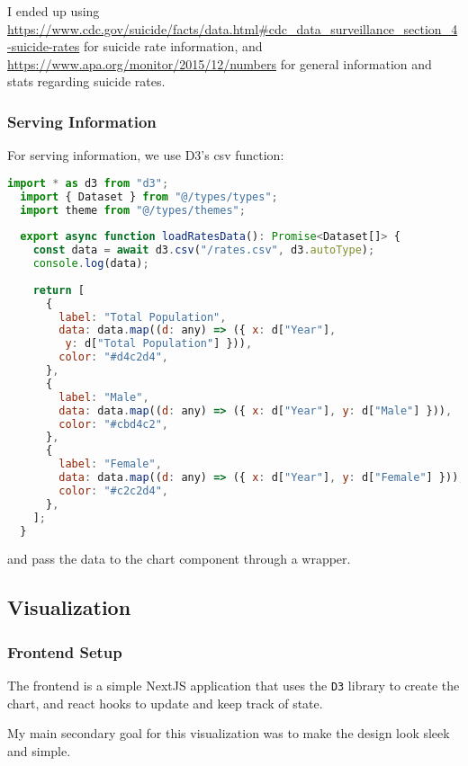 \documentclass{article}
\begin{document}
I ended up using \url{https://www.cdc.gov/suicide/facts/data.html#cdc_data_surveillance_section_4-suicide-rates}
for suicide rate information, and \url{https://www.apa.org/monitor/2015/12/numbers}
for general information and stats regarding suicide rates.

\subsubsection{Serving Information} 
\label{subsubsec:Serving Backend Server}

For serving information, we use D3's csv function:

\begin{lstlisting}[language=JavaScript]
  import * as d3 from "d3";
  import { Dataset } from "@/types/types";
  import theme from "@/types/themes";
  
  export async function loadRatesData(): Promise<Dataset[]> {
    const data = await d3.csv("/rates.csv", d3.autoType); 
    console.log(data); 
  
    return [
      {
        label: "Total Population",
        data: data.map((d: any) => ({ x: d["Year"],
         y: d["Total Population"] })), 
        color: "#d4c2d4", 
      },
      {
        label: "Male",
        data: data.map((d: any) => ({ x: d["Year"], y: d["Male"] })),
        color: "#cbd4c2", 
      },
      {
        label: "Female",
        data: data.map((d: any) => ({ x: d["Year"], y: d["Female"] })), 
        color: "#c2c2d4", 
      },
    ];
  }  
\end{lstlisting}

and pass the data to the chart component through a wrapper.

\subsection{Visualization}
\label{subsec:Visualization}

\subsubsection{Frontend Setup}
\label{subsubsec:Frontend}

The frontend is a simple NextJS application that uses the 
\texttt{D3} library to create the chart, and react hooks to update 
and keep track of state.

My main secondary goal for this visualization was to make the 
design look sleek and simple. 
\end{document}
